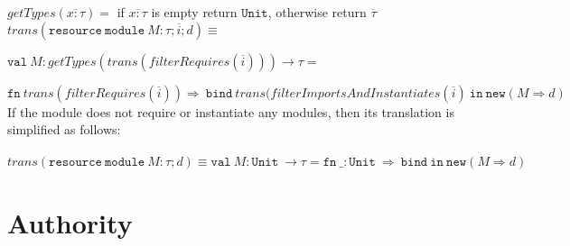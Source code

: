 \documentclass{llncs}
\newcommand{\keywadj}[1]{\mathtt{#1}}
\newcommand{\keyw}[1]{\keywadj{#1}~}
\begin{document}
\noindent$getTypes(\overline{x : \tau}) = $ if $\overline{x : \tau}$ is empty return $\keywadj{Unit}$, otherwise return $\overline{\tau}$\\

\noindent$trans(\keyw{resource} \keyw{module} M : \tau; \overline{i}; d) \equiv$

$\keyw{val} M : getTypes(trans(filterRequires(\overline{i}))) \rightarrow \tau = $

$\keyw{fn} trans(filterRequires(\overline{i})) \Rightarrow~\keyw{bind} trans(filterImportsAndInstantiates(\overline{i})~\keyw{in} \keywadj{new}(M \Rightarrow d)$\\

\noindent If the module does not require or instantiate any modules, then its translation is simplified as follows:
\\\\
\noindent$trans(\keyw{resource} \keyw{module} M : \tau; d) \equiv \keyw{val} M : \keyw{Unit} \rightarrow \tau = \keyw{fn} \_ : \keyw{Unit} \Rightarrow~\keyw{bind} \keyw{in} \keywadj{new}(M \Rightarrow d)$


\newpage

\section{Authority}
\end{document}
